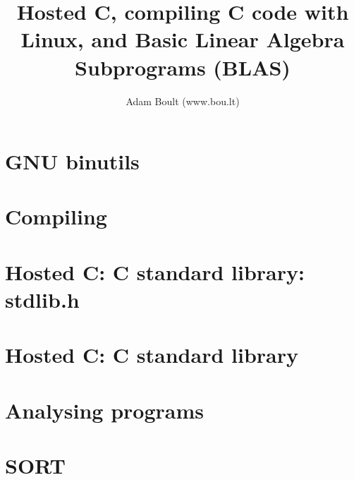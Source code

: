 \documentclass[oneside]{book}
\begin{document}
\author{Adam Boult (www.bou.lt)}
\title{Hosted C, compiling C code with Linux, and Basic Linear Algebra Subprograms (BLAS)}
\maketitle

\setcounter{tocdepth}{0}
\tableofcontents



\part{GNU binutils}


\part{Compiling}




\part{Hosted C: C standard library: stdlib.h}






\part{Hosted C: C standard library}













\part{Analysing programs}




\part{SORT}

\end{document}
